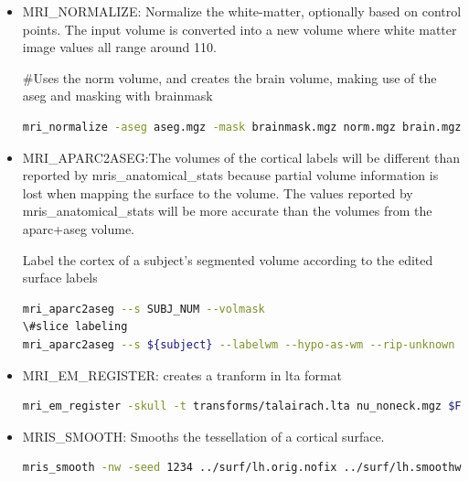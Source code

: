 \documentclass{article}
\begin{document}
\begin{itemize}
\#Resample the native space binary ROI file into "brainmask" space
    \begin{lstlisting}[language=bash, basicstyle=\tiny]
mri_convert -rl /subA/mri/T1w_hires.nii.gz -rt nearest /subA/mri/filled.mgz /subA/mri/filled.hires.mgz
    \end{lstlisting}

\item MRI\_NORMALIZE: Normalize the white-matter, optionally based on control points.
The input volume is converted into a new volume where white matter image values all range around 110.

\#Uses the norm volume, and creates the brain volume, making use of the aseg and masking with brainmask
    \begin{lstlisting}[language=bash, basicstyle=\tiny]
mri_normalize -aseg aseg.mgz -mask brainmask.mgz norm.mgz brain.mgz
    \end{lstlisting}

\item MRI\_APARC2ASEG:The volumes of the cortical labels will be different than
         reported by mris\_anatomical\_stats because partial volume information
         is lost when mapping the surface to the volume. The values reported by
         mris\_anatomical\_stats will be more accurate than the volumes from the
         aparc+aseg volume.
         
Label the cortex of a subject's segmented volume according to the edited surface labels
    \begin{lstlisting}[language=bash, basicstyle=\tiny]
mri_aparc2aseg --s SUBJ_NUM --volmask
\#slice labeling
mri_aparc2aseg --s ${subject} --labelwm --hypo-as-wm --rip-unknown --volmask --o ${subj_dir}/mri/wmdivided --annot aparc.split
    \end{lstlisting}

\item MRI\_EM\_REGISTER: creates a tranform in lta format
    \begin{lstlisting}[language=bash, basicstyle=\tiny]
mri_em_register -skull -t transforms/talairach.lta nu_noneck.mgz $FREESURFER_HOME/average/RB_all_withskull_2008-03-26.gca transforms/talairach_with_skull.lta
    \end{lstlisting}

\item MRIS\_SMOOTH: Smooths the tessellation of a cortical surface.
    \begin{lstlisting}[language=bash, basicstyle=\tiny]
mris_smooth -nw -seed 1234 ../surf/lh.orig.nofix ../surf/lh.smoothwm.nofix
    \end{lstlisting}


\end{itemize}
\end{document}
